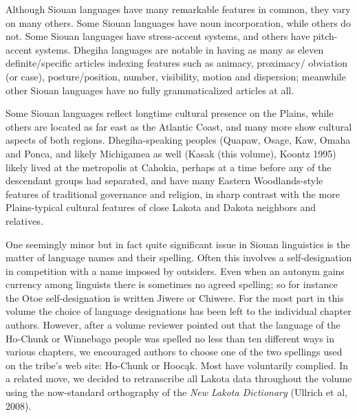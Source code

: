 \begin{refsection}
Although Siouan languages have many remarkable features in common, they vary on many others.  Some Siouan languages have noun incorporation, while others do not. Some Siouan languages have stress-accent systems, and others have pitch-accent systems. Dhegiha languages are notable in having as many as eleven definite/specific articles indexing features such as animacy, proximacy/ obviation (or case), posture/position, number, visibility, motion and dispersion; meanwhile other Siouan languages have no fully grammaticalized articles at all.


Some Siouan languages reflect longtime cultural presence on the Plains, while others are located as far east as the Atlantic Coast, and many more show cultural aspects of both regions. Dhegiha-speaking peoples (Quapaw, Osage, Kaw, Omaha and Ponca, and likely Michigamea as well (Kasak (this volume), Koontz 1995) likely lived at the metropolis at Cahokia, perhaps at a time before any of the descendant groups had separated, and have many Eastern Woodlands-style features of traditional governance and religion, in sharp contrast with the more Plains-typical cultural features of close Lakota and Dakota neighbors and relatives.

One seemingly minor but in fact quite significant issue in Siouan linguistics is the matter of language names and their spelling. Often this involves a self-designation in competition with a name imposed by outsiders. Even when an autonym gains currency among linguists there is sometimes no agreed spelling; so for instance the Otoe self-designation is written Jiwere or Chiwere. For the most part in this volume the choice of language designations has been left to the individual chapter authors. However, after a volume reviewer pointed out that the language of the Ho-Chunk or Winnebago people was spelled no less than ten different ways in various chapters, we encouraged authors to choose one of the two spellings used on the tribe's web site:  Ho-Chunk or Hooc\k{a}k.  Most have voluntarily complied.  In a related move, we decided to retranscribe all Lakota data throughout the volume using the now-standard orthography of the \textit{New Lakota Dictionary} (Ullrich et al, 2008).


\end{refsection}

